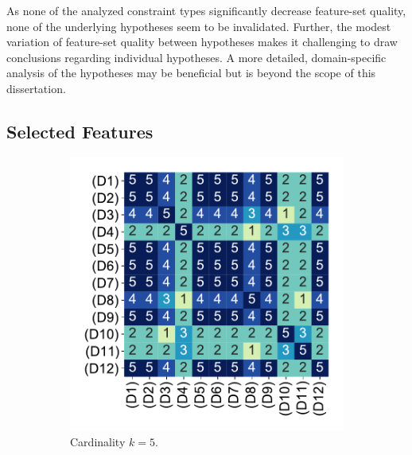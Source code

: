 As none of the analyzed constraint types significantly decrease feature-set quality, none of the underlying hypotheses seem to be invalidated.
Further, the modest variation of feature-set quality between hypotheses makes it challenging to draw conclusions regarding individual hypotheses.
A more detailed, domain-specific analysis of the hypotheses may be beneficial but is beyond the scope of this dissertation.

\subsection{Selected Features}
\label{sec:ms:evaluation:features}

\begin{figure}[t]
	\centering
	\begin{subfigure}{0.48\textwidth}
		\centering
		\includegraphics[width=\textwidth, trim=15 15 15 15, clip]{plots/ms-selected-similarity-card5.pdf}
		\caption{Cardinality $k=5$.}
		\label{fig:ms:selected-similarity-card5}
	\end{subfigure}
	\hfill
	\begin{subfigure}{0.48\textwidth}
		\centering

\end{subfigure}
\end{figure}
